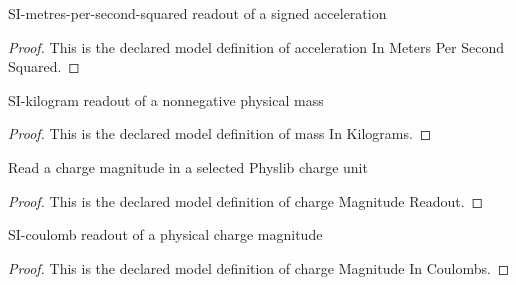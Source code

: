 \begin{definition}
  \label{def:physics:phyx-mini-0838:phyxminiproblems-problemphyxmini0838-accelerationinmeterspersecondsquared}
  SI-metres-per-second-squared readout of a signed acceleration
\end{definition}
\begin{proof}
  This is the declared model definition of acceleration In Meters Per Second Squared.
\end{proof}
\begin{definition}
  \label{def:physics:phyx-mini-0838:phyxminiproblems-problemphyxmini0838-massinkilograms}
  SI-kilogram readout of a nonnegative physical mass
\end{definition}
\begin{proof}
  This is the declared model definition of mass In Kilograms.
\end{proof}
\begin{definition}
  \label{def:physics:phyx-mini-0838:phyxminiproblems-problemphyxmini0838-chargemagnitudereadout}
  Read a charge magnitude in a selected Physlib charge unit
\end{definition}
\begin{proof}
  This is the declared model definition of charge Magnitude Readout.
\end{proof}
\begin{definition}
  \label{def:physics:phyx-mini-0838:phyxminiproblems-problemphyxmini0838-chargemagnitudeincoulombs}
  SI-coulomb readout of a physical charge magnitude
\end{definition}
\begin{proof}
  This is the declared model definition of charge Magnitude In Coulombs.
\end{proof}
